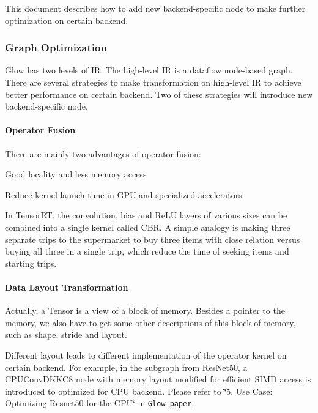 This document describes how to add new backend-\/specific node to make further optimization on certain backend.

\subsubsection*{Graph Optimization}

Glow has two levels of IR. The high-\/level IR is a dataflow node-\/based graph. There are several strategies to make transformation on high-\/level IR to achieve better performance on certain backend. Two of these strategies will introduce new backend-\/specific node.

\paragraph*{Operator Fusion}

There are mainly two advantages of operator fusion\+:


\begin{DoxyItemize}
\item Good locality and less memory access
\item Reduce kernel launch time in G\+PU and specialized accelerators
\end{DoxyItemize}

In Tensor\+RT, the convolution, bias and Re\+LU layers of various sizes can be combined into a single kernel called C\+BR. A simple analogy is making three separate trips to the supermarket to buy three items with close relation versus buying all three in a single trip, which reduce the time of seeking items and starting trips.

\paragraph*{Data Layout Transformation}

Actually, a Tensor is a view of a block of memory. Besides a pointer to the memory, we also have to get some other descriptions of this block of memory, such as shape, stride and layout.

Different layout leads to different implementation of the operator kernel on certain backend. For example, in the subgraph from Res\+Net50, a {\ttfamily C\+P\+U\+Conv\+D\+K\+K\+C8} node with memory layout modified for efficient S\+I\+MD access is introduced to optimized for C\+PU backend. Please refer to \char`\"{}5. Use Case\+: Optimizing Resnet50 for the C\+P\+U\char`\"{} in \href{https://arxiv.org/abs/1805.00907}{\tt Glow paper}.

